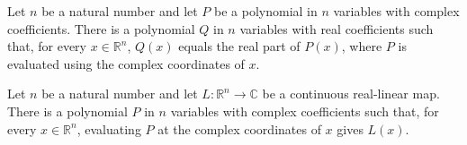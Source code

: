 \begin{lemma}
\label{BooleanAnalysis.GaussianSpace.exists_real_polynomial_re}
\leanok
{}
Let $n$ be a natural number and let $P$ be a polynomial in $n$ variables with complex
coefficients. There is a polynomial $Q$ in $n$ variables with real coefficients such
that, for every $x\in\mathbb R^n$, $Q(x)$ equals the real part of $P(x)$, where $P$ is
evaluated using the complex coordinates of $x$.
\end{lemma}

\begin{lemma}
\label{BooleanAnalysis.GaussianSpace.exists_polynomial_eval_linear}
\leanok
{}
Let $n$ be a natural number and let $L\colon\mathbb R^n\to\mathbb C$ be a continuous
real-linear map. There is a polynomial $P$ in $n$ variables with complex coefficients
such that, for every $x\in\mathbb R^n$, evaluating $P$ at the complex coordinates of $x$
gives $L(x)$.
\end{lemma}
